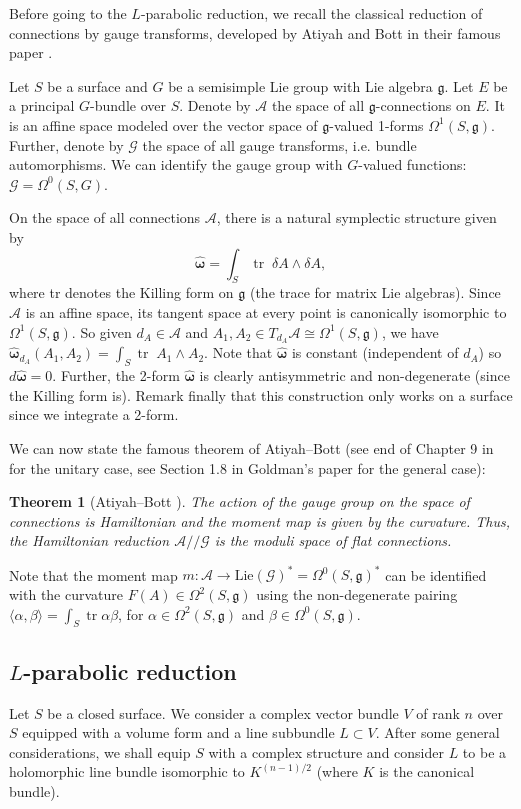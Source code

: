 \documentclass[11pt]{amsart}
\newtheorem{thm}{Theorem}
\numberwithin{thm}{section} %
\numberwithin{equation}{section} %
\numberwithin{figure}{section} %
\newcommand*{\g}{\mathfrak{g}}
\DeclareMathOperator{\tr}{tr}
\begin{document}
Before going to the $L$-parabolic reduction, we recall the classical reduction of connections by gauge transforms, developed by Atiyah and Bott in their famous paper \cite{AtBott}.

Let $S$ be a surface and $G$ be a semisimple Lie group with Lie algebra $\g$. Let $E$ be a principal $G$-bundle over $S$. Denote by $\mathcal{A}$ the space of all $\g$-connections on $E$. It is an affine space modeled over the vector space of $\g$-valued 1-forms $\Omega^1(S, \g)$. Further, denote by $\mathcal{G}$ the space of all gauge transforms, i.e. bundle automorphisms. We can identify the gauge group with $G$-valued functions: $\mathcal{G}=\Omega^0(S,G)$.

On the space of all connections $\mathcal{A}$, there is a natural symplectic structure given by $$\bm\hat{\omega} = \int_{S} \tr \;\delta A \wedge \delta A,$$ where tr
denotes the Killing form on $\g$ (the trace for matrix Lie algebras).
Since $\mathcal{A}$ is an affine space, its tangent space at every point is canonically isomorphic to $\Omega^1(S, \g)$. So given $d_A \in \mathcal{A}$ and $A_1, A_2 \in T_{d_A}\mathcal{A} \cong \Omega^1(S, \g)$, we have $\bm\hat{\omega}_{d_A}(A_1, A_2) = \int_{S} \tr \; A_1\wedge A_2$. Note that $\bm\hat{\omega}$ is constant (independent of $d_A$) so $d\bm\hat{\omega} = 0$. Further, the 2-form $\bm\hat{\omega}$ is clearly antisymmetric and non-degenerate (since the Killing form is). Remark finally that this construction only works on a surface since we integrate a 2-form.

We can now state the famous theorem of Atiyah--Bott (see end of Chapter 9 in \cite{AtBott} for the unitary case, see Section 1.8 in Goldman's paper \cite{Goldman.2} for the general case):
\begin{thm}[Atiyah--Bott \cite{AtBott}]\label{Thm:AB}
The action of the gauge group on the space of connections is Hamiltonian and the moment map is given by the curvature. Thus, the Hamiltonian reduction $\mathcal{A}//\mathcal{G}$ is the moduli space of flat connections.
\end{thm}

Note that the moment map $m:\mathcal{A}\to\mathrm{Lie}(\mathcal{G})^*=\Omega^0(S,\g)^*$ can be identified with the curvature $F(A)\in\Omega^2(S,\g)$ using the non-degenerate pairing  
$\langle \alpha,\beta\rangle = \int_{S} \tr \alpha \beta$, for $\alpha\in \Omega^2(S,\g)$ and $\beta\in\Omega^0(S,\g)$. 



\subsection{$L$-parabolic reduction}\label{settingparab}
Let $S$ be a closed surface. We consider a complex vector bundle $V$ of rank $n$ over $S$ equipped with a volume form and a line subbundle $L\subset V$. After some general considerations, we shall equip $S$ with a complex structure and consider $L$ to be a holomorphic line bundle isomorphic to $K^{(n-1)/2}$ (where $K$ is the canonical bundle).
 
\end{document}

